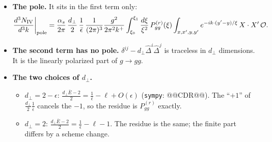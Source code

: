 \documentclass[10pt]{article}
\numberwithin{equation}{section}
\newcommand{\Dh}{\hat\Delta}
\newcommand{\OO}{\mathcal O}
\newcommand{\pre}{\frac{1}{(2\pi)^3}\frac{g^2}{2\pi^2k^+}}
\begin{document}
\begin{itemize}
\item \textbf{The pole.} It sits in the first term only:
\begin{equation}
\frac{d^3N_{\rm IV}}{d^3k}\bigg|_{\rm pole}=\frac{\alpha_s}{2\pi}\,\frac{d_\perp}{2}\,\frac{1}{\bar\epsilon}\,\pre\int_{\xi_0}^{\xi_1}\frac{d\xi}{\xi^2}\,P^{(r)}_{gg}(\xi)\int_{x,x',y,y'}e^{-ik\cdot(y'-y)/\xi}\,X\cdot X'\,\OO .
\label{eq:pole}
\end{equation}
\item \textbf{The second term has no pole.} $\delta^{ij}-d_\perp\Dh^i\Dh^j$ is traceless in $d_\perp$ dimensions. It is the linearly polarized part of $g\to gg$.
\item \textbf{The two choices of $d_\perp$.}
\begin{itemize}
\item $d_\perp=2-\epsilon$: $\frac{d_\perp\bar E-2}{2}=\frac1{\bar\epsilon}-\ell+O(\epsilon)$ (\texttt{sympy}: @@CDR@@). The ``$+1$'' of $\frac{d_\perp}{2}\frac{1}{\bar\epsilon}$ cancels the $-1$, so the residue is $P^{(r)}_{gg}$ exactly.
\item $d_\perp=2$: $\frac{d_\perp\bar E-2}{2}=\frac1{\bar\epsilon}-\ell-1$. The residue is the same; the finite part differs by a scheme change.
\end{itemize}
\end{itemize}

\end{document}
